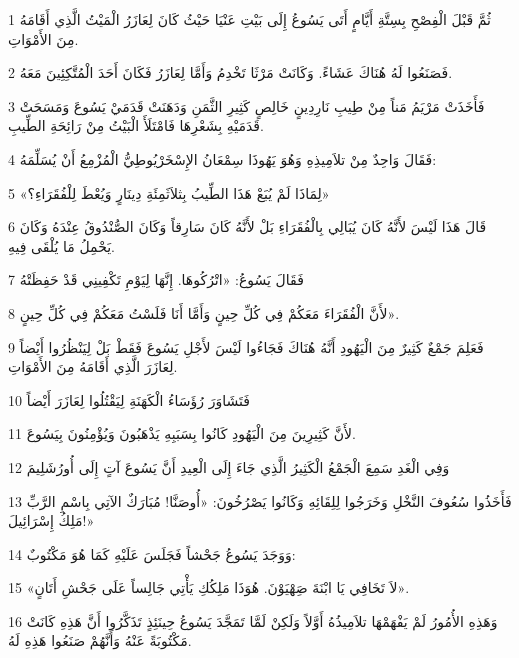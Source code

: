 \par 1 ثُمَّ قَبْلَ الْفِصْحِ بِسِتَّةِ أَيَّامٍ أَتَى يَسُوعُ إِلَى بَيْتِ عَنْيَا حَيْثُ كَانَ لِعَازَرُ الْمَيْتُ الَّذِي أَقَامَهُ مِنَ الأَمْوَاتِ.
\par 2 فَصَنَعُوا لَهُ هُنَاكَ عَشَاءً. وَكَانَتْ مَرْثَا تَخْدِمُ وَأَمَّا لِعَازَرُ فَكَانَ أَحَدَ الْمُتَّكِئِينَ مَعَهُ.
\par 3 فَأَخَذَتْ مَرْيَمُ مَناً مِنْ طِيبِ نَارِدِينٍ خَالِصٍ كَثِيرِ الثَّمَنِ وَدَهَنَتْ قَدَمَيْ يَسُوعَ وَمَسَحَتْ قَدَمَيْهِ بِشَعْرِهَا فَامْتَلَأَ الْبَيْتُ مِنْ رَائِحَةِ الطِّيبِ.
\par 4 فَقَالَ وَاحِدٌ مِنْ تلاَمِيذِهِ وَهُوَ يَهُوذَا سِمْعَانُ الإِسْخَرْيُوطِيُّ الْمُزْمِعُ أَنْ يُسَلِّمَهُ:
\par 5 «لِمَاذَا لَمْ يُبَعْ هَذَا الطِّيبُ بِثلاَثَمِئَةِ دِينَارٍ وَيُعْطَ لِلْفُقَرَاءِ؟»
\par 6 قَالَ هَذَا لَيْسَ لأَنَّهُ كَانَ يُبَالِي بِالْفُقَرَاءِ بَلْ لأَنَّهُ كَانَ سَارِقاً وَكَانَ الصُّنْدُوقُ عِنْدَهُ وَكَانَ يَحْمِلُ مَا يُلْقَى فِيهِ.
\par 7 فَقَالَ يَسُوعُ: «اتْرُكُوهَا. إِنَّهَا لِيَوْمِ تَكْفِينِي قَدْ حَفِظَتْهُ
\par 8 لأَنَّ الْفُقَرَاءَ مَعَكُمْ فِي كُلِّ حِينٍ وَأَمَّا أَنَا فَلَسْتُ مَعَكُمْ فِي كُلِّ حِينٍ».
\par 9 فَعَلِمَ جَمْعٌ كَثِيرٌ مِنَ الْيَهُودِ أَنَّهُ هُنَاكَ فَجَاءُوا لَيْسَ لأَجْلِ يَسُوعَ فَقَطْ بَلْ لِيَنْظُرُوا أَيْضاً لِعَازَرَ الَّذِي أَقَامَهُ مِنَ الأَمْوَاتِ.
\par 10 فَتَشَاوَرَ رُؤَسَاءُ الْكَهَنَةِ لِيَقْتُلُوا لِعَازَرَ أَيْضاً
\par 11 لأَنَّ كَثِيرِينَ مِنَ الْيَهُودِ كَانُوا بِسَبَبِهِ يَذْهَبُونَ وَيُؤْمِنُونَ بِيَسُوعَ.
\par 12 وَفِي الْغَدِ سَمِعَ الْجَمْعُ الْكَثِيرُ الَّذِي جَاءَ إِلَى الْعِيدِ أَنَّ يَسُوعَ آتٍ إِلَى أُورُشَلِيمَ
\par 13 فَأَخَذُوا سُعُوفَ النَّخْلِ وَخَرَجُوا لِلِقَائِهِ وَكَانُوا يَصْرُخُونَ: «أُوصَنَّا! مُبَارَكٌ الآتِي بِاسْمِ الرَّبِّ مَلِكُ إِسْرَائِيلَ!»
\par 14 وَوَجَدَ يَسُوعُ جَحْشاً فَجَلَسَ عَلَيْهِ كَمَا هُوَ مَكْتُوبٌ:
\par 15 «لاَ تَخَافِي يَا ابْنَةَ صَِهْيَوْنَ. هُوَذَا مَلِكُكِ يَأْتِي جَالِساً عَلَى جَحْشِ أَتَانٍ».
\par 16 وَهَذِهِ الأُمُورُ لَمْ يَفْهَمْهَا تلاَمِيذُهُ أَوَّلاً وَلَكِنْ لَمَّا تَمَجَّدَ يَسُوعُ حِينَئِذٍ تَذَكَّرُوا أَنَّ هَذِهِ كَانَتْ مَكْتُوبَةً عَنْهُ وَأَنَّهُمْ صَنَعُوا هَذِهِ لَهُ.
